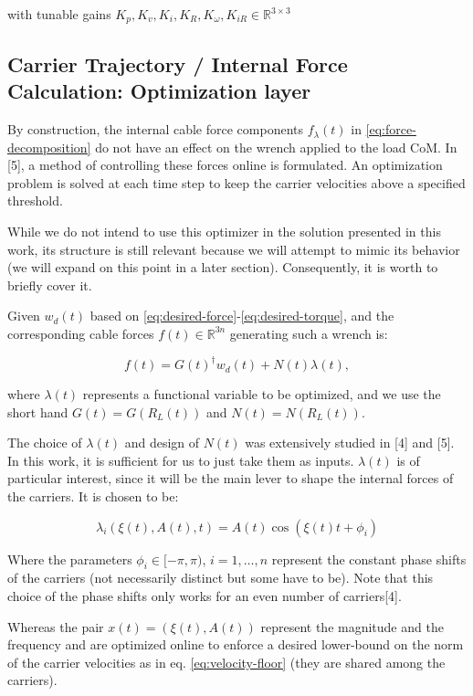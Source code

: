 with tunable gains $K_p, K_v, K_i, K_R, K_\omega, K_{iR} \in
\mathbb{R}^{3 \times 3}$

\subsection{Carrier Trajectory / Internal Force Calculation: Optimization layer}

By construction, the internal cable force components $f_\lambda(t)$ in
\eqref{eq:force-decomposition} do not have an effect on the wrench
applied to the load CoM. In [5], a method of controlling these forces
online is formulated. An optimization problem is solved at each time step
to keep the carrier velocities above a specified threshold.

While we do not intend to use this optimizer in the solution presented in
this work, its structure is still relevant because we will attempt to
mimic its behavior (we will expand on this point in a later section).
Consequently, it is worth to briefly cover it.

Given $w_d(t)$ based on \eqref{eq:desired-force}-\eqref{eq:desired-torque},
and the corresponding cable forces $f(t) \in \mathbb{R}^{3n}$ generating
such a wrench is:

\begin{equation}
  f(t) = G(t)^\dagger w_d(t) + N(t) \lambda(t),
  \label{eq:optimizer-force}
\end{equation}

where $\lambda(t)$ represents a functional variable to be optimized, and
we use the short hand $G(t) = G(R_L(t))$ and $N(t) = N(R_L(t))$.

The choice of $\lambda(t)$ and design of $N(t)$ was extensively studied
in [4] and [5]. In this work, it is sufficient for us to just take them
as inputs. $\lambda(t)$ is of particular interest, since it will be the
main lever to shape the internal forces of the carriers. It is chosen to
be:

\begin{equation}
  \lambda_i(\xi(t), A(t), t) = A(t) \cos(\xi(t) t + \phi_i)
  \label{eq:lambda-def}
\end{equation}

Where the parameters $\phi_i \in [-\pi, \pi)$, $i = 1, \dots, n$ represent
the constant phase shifts of the carriers (not necessarily distinct but
some have to be). Note that this choice of the phase shifts only works for
an even number of carriers[4]. 

Whereas the pair $x(t) = (\xi(t), A(t))$ represent the magnitude and the
frequency and are optimized online to enforce a desired lower-bound on
the norm of the carrier velocities as in eq. \eqref{eq:velocity-floor}
(they are shared among the carriers).

